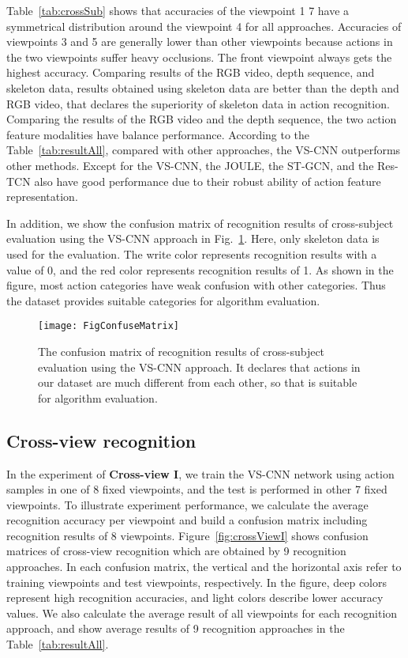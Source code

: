 \documentclass[journal]{IEEEtran}
\begin{document}
Table~\ref{tab:crossSub} shows that accuracies of the viewpoint 1  7 have a symmetrical distribution around the viewpoint 4 for all approaches. Accuracies of viewpoints 3 and 5 are generally lower than other viewpoints because actions in the two viewpoints suffer heavy occlusions. The front viewpoint always gets the highest accuracy. Comparing results of the RGB video, depth sequence, and skeleton data, results obtained using skeleton data are better than the depth and RGB video, that declares the superiority of skeleton data in action recognition. Comparing the results of the RGB video and the depth sequence, the two action feature modalities have balance performance.
According to the Table~\ref{tab:resultAll}, compared with other approaches, the VS-CNN outperforms other methods. Except for the VS-CNN, the JOULE, the ST-GCN, and the Res-TCN also have good performance due to their robust ability of action feature representation.

In addition, we show the confusion matrix of recognition results of cross-subject evaluation using the VS-CNN approach in Fig.~\ref{fig:confusionMatrix}. Here, only skeleton data is used for the evaluation. The write color represents recognition results with a value of 0, and the red color represents recognition results of 1. As shown in the figure, most action categories have weak confusion with other categories. Thus the dataset provides suitable categories for algorithm evaluation.
\begin{figure}[t]
\begin{center}
\texttt{[image: FigConfuseMatrix]}
\end{center}
   \caption{The confusion matrix of recognition results of cross-subject evaluation using the VS-CNN approach. It declares that actions in our dataset are much different from each other, so that is suitable for algorithm evaluation.}
\label{fig:confusionMatrix}
\end{figure}
\subsection{Cross-view recognition}
In the experiment of \textbf{Cross-view I}, we train the VS-CNN network using action samples in one of 8 fixed viewpoints, and the test is performed in other 7 fixed viewpoints. To illustrate experiment performance, we calculate the average recognition accuracy per viewpoint and build a confusion matrix including recognition results of 8 viewpoints. Figure~\ref{fig:crossViewI} shows confusion matrices of cross-view recognition which are obtained by 9 recognition approaches. In each confusion matrix, the vertical and the horizontal axis refer to training viewpoints and test viewpoints, respectively. In the figure, deep colors represent high recognition accuracies, and light colors describe lower accuracy values. We also calculate the average result of all viewpoints for each recognition approach, and show average results of 9 recognition approaches in the Table~\ref{tab:resultAll}.
\end{document}
